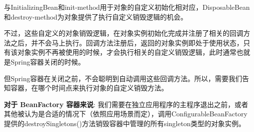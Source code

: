与InitializingBean和init-method用于对象的自定义初始化相对应，DisposableBean和destroy-method为对象提供了执行自定义销毁逻辑的机会。

不过，这些自定义的对象销毁逻辑，在对象实例初始化完成并注册了相关的回调方法之后，并不会马上执行。回调方法注册后，返回的对象实例即处于使用状态，只有该对象实例不再被使用的时候，才会执行相关的自定义销毁逻辑，此时通常也就是Spring容器关闭的时候。

但Spring容器在关闭之前，不会聪明到自动调用这些回调方法。所以，需要我们告知容器，在哪个时间点来执行对象的自定义销毁方法。

\textbf{对于 BeanFactory 容器来说}: 我们需要在独立应用程序的主程序退出之前，或者其他被认为是合适的情况下（依照应用场景而定），调用ConfigurableBeanFactory提供的destroySingletons()方法销毁容器中管理的所有singleton类型的对象实例。

\newpage  